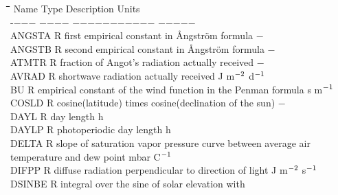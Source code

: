 \documentclass[11pt]{article}
\begin{document}
\begin{tabbing}
\hspace{1.27cm}\=\hspace{1.27cm}\=\hspace{1.27cm}\=\hspace{1.27cm}\=%
\hspace{1.27cm}\=\hspace{1.27cm}\=\hspace{1.27cm}\=\hspace{1.27cm}\=%
\hspace{1.27cm}\=\hspace{1.27cm}\=\kill
Name   \> Type \> Description                                        \> \> \> \> \> \> \> \> Units\\
-$-$$-$$-$   \> \> $-$$-$$-$$-$    \> $-$$-$$-$$-$$-$$-$$-$$-$$-$$-$$-$                                        \> \> \> \> \> \> \> $-$$-$$-$$-$$-$\\
ANGSTA \> \> R   \> first empirical constant in \AA ngstr\"{o}m formula             \> \> \> \> \> \> \> $-$\\
ANGSTB \> \> R   \> second empirical constant in \AA ngstr\"{o}m formula             \> \> \> \> \> \> \> $-$\\
ATMTR   \> \> R   \> fraction of Angot's radiation actually received    \> \> \> \> \> \> \> $-$\\
AVRAD   \> \> R   \> shortwave radiation actually received              \> \> \> \> \> \> \> J m$^{{\rm -2}}$ d$^{{\rm -1}}$\\
BU      \> \> R   \> empirical constant of the wind function in the Penman formula  \> \> \> \> \> \> \> s m$^{{\rm -1}}$  \\
COSLD   \> \> R   \> cosine(latitude) times cosine(declination of the sun)       \> \> \> \> \> \> \> $-$\\
DAYL    \> \> R   \> day length                                         \> \> \> \> \> \> \> h\\
DAYLP   \> \> R   \> photoperiodic day length                           \> \> \> \> \> \> \> h\\
DELTA   \> \> R   \> slope of saturation vapor pressure curve between average air \\
\>\> \> temperature and dew point \> \> \> \> \> \> \> mbar \degrees C$^{{\rm -1}}$\\
DIFPP\> \> R\> diffuse radiation perpendicular to direction of light\> \> \> \> \> \> \> J m$^{{\rm -2}}$ s$^{{\rm -1}}$\\
DSINBE\> \> R  \> integral over the sine of solar elevation with\\
$$
\end{tabbing}
\end{document}
